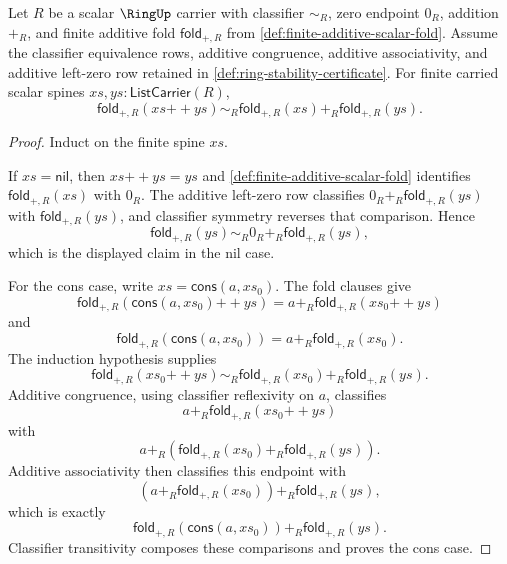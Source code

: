 \begin{lemma}
\label{lem:finite-additive-fold-append-decomposition}
Let $R$ be a scalar $\RingUp$ carrier with classifier $\sim_R$, zero endpoint $0_R$, addition $+_R$, and finite additive fold $\mathsf{fold}_{+,R}$ from \autoref{def:finite-additive-scalar-fold}. Assume the classifier equivalence rows, additive congruence, additive associativity, and additive left-zero row retained in \autoref{def:ring-stability-certificate}. For finite carried scalar spines $xs,ys:\mathsf{ListCarrier}(R)$,
$$
\mathsf{fold}_{+,R}(xs{++}ys)
\sim_R
\mathsf{fold}_{+,R}(xs)+_R\mathsf{fold}_{+,R}(ys).
$$
\end{lemma}
\begin{proof}
Induct on the finite spine $xs$.

If $xs=\mathsf{nil}$, then $xs{++}ys=ys$ and \autoref{def:finite-additive-scalar-fold} identifies $\mathsf{fold}_{+,R}(xs)$ with $0_R$. The additive left-zero row classifies $0_R+_R\mathsf{fold}_{+,R}(ys)$ with $\mathsf{fold}_{+,R}(ys)$, and classifier symmetry reverses that comparison. Hence
$$
\mathsf{fold}_{+,R}(ys)
\sim_R
0_R+_R\mathsf{fold}_{+,R}(ys),
$$
which is the displayed claim in the nil case.

For the cons case, write $xs=\mathsf{cons}(a,xs_0)$. The fold clauses give
$$
\mathsf{fold}_{+,R}(\mathsf{cons}(a,xs_0){++}ys)
=
a+_R\mathsf{fold}_{+,R}(xs_0{++}ys)
$$
and
$$
\mathsf{fold}_{+,R}(\mathsf{cons}(a,xs_0))
=
a+_R\mathsf{fold}_{+,R}(xs_0).
$$
The induction hypothesis supplies
$$
\mathsf{fold}_{+,R}(xs_0{++}ys)
\sim_R
\mathsf{fold}_{+,R}(xs_0)+_R\mathsf{fold}_{+,R}(ys).
$$
Additive congruence, using classifier reflexivity on $a$, classifies
$$
a+_R\mathsf{fold}_{+,R}(xs_0{++}ys)
$$
with
$$
a+_R(\mathsf{fold}_{+,R}(xs_0)+_R\mathsf{fold}_{+,R}(ys)).
$$
Additive associativity then classifies this endpoint with
$$
(a+_R\mathsf{fold}_{+,R}(xs_0))+_R\mathsf{fold}_{+,R}(ys),
$$
which is exactly
$$
\mathsf{fold}_{+,R}(\mathsf{cons}(a,xs_0))+_R\mathsf{fold}_{+,R}(ys).
$$
Classifier transitivity composes these comparisons and proves the cons case.
\end{proof}

